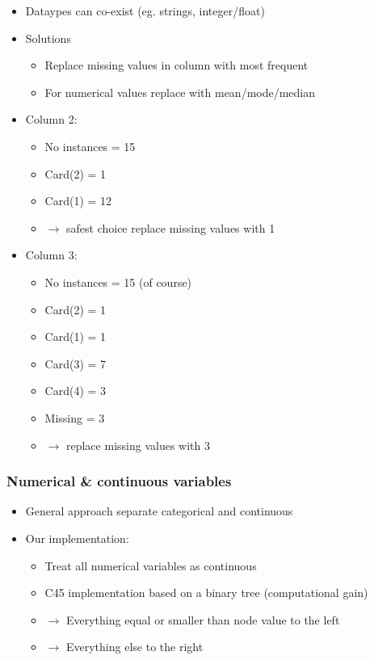 \begin{frame}[allowframebreaks]
\begin{itemize}
\item Dataypes can co-exist (eg. strings, integer/float)
\vfill
\item Solutions
\begin{itemize}
\item Replace missing values in column with most frequent
\item For numerical values replace with mean/mode/median
\end{itemize}
\item Column 2:
\begin{itemize}
\item No instances = 15
\item Card(2) = 1
\item Card(1) = 12
\item $\rightarrow$ safest choice replace missing values with 1 
\end{itemize}
\item Column 3:
\begin{itemize}
\item No instances = 15 (of course)
\item Card(2) = 1 
\item Card(1) = 1
\item Card(3) = 7
\item Card(4) = 3
\item Missing = 3
\item $\rightarrow$ replace missing values with 3
\end{itemize}
\end{itemize}
\end{frame}

\begin{frame}
\frametitle{Numerical \& continuous variables}
\begin{itemize}
\item General approach separate categorical and continuous
\vfill
\item Our implementation:
\begin{itemize}
\vfill
\item Treat all numerical variables as continuous
\vfill
\item C45 implementation based on  a binary tree (computational gain)
\vfill
\item $\rightarrow$ Everything equal or smaller than node value to the left
\vfill
\item $\rightarrow$ Everything else to the right
\end{itemize}
\end{itemize}
\end{frame}




